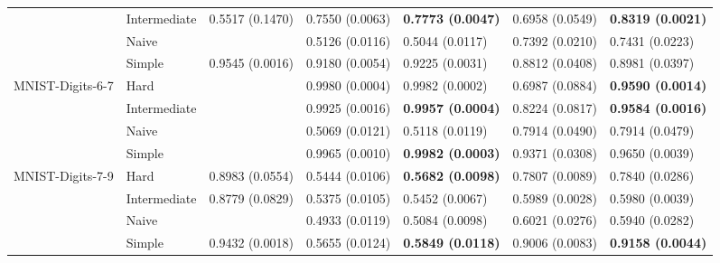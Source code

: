 \begin{tabular}{lllllll}
                 & Intermediate &  0.5517 (0.1470) &           0.7550 (0.0063) &  \textbf{0.7773 (0.0047)} &           0.6958 (0.0549) &  \textbf{0.8319 (0.0021)} \\
                 & Naive &                  &           0.5126 (0.0116) &           0.5044 (0.0117) &           0.7392 (0.0210) &           0.7431 (0.0223) \\
                 & Simple &  0.9545 (0.0016) &           0.9180 (0.0054) &           0.9225 (0.0031) &           0.8812 (0.0408) &           0.8981 (0.0397) \\
MNIST-Digits-6-7 & Hard &                  &           0.9980 (0.0004) &           0.9982 (0.0002) &           0.6987 (0.0884) &  \textbf{0.9590 (0.0014)} \\
                 & Intermediate &                  &           0.9925 (0.0016) &  \textbf{0.9957 (0.0004)} &           0.8224 (0.0817) &  \textbf{0.9584 (0.0016)} \\
                 & Naive &                  &           0.5069 (0.0121) &           0.5118 (0.0119) &           0.7914 (0.0490) &           0.7914 (0.0479) \\
                 & Simple &                  &           0.9965 (0.0010) &  \textbf{0.9982 (0.0003)} &           0.9371 (0.0308) &           0.9650 (0.0039) \\
MNIST-Digits-7-9 & Hard &  0.8983 (0.0554) &           0.5444 (0.0106) &  \textbf{0.5682 (0.0098)} &           0.7807 (0.0089) &           0.7840 (0.0286) \\
                 & Intermediate &  0.8779 (0.0829) &           0.5375 (0.0105) &           0.5452 (0.0067) &           0.5989 (0.0028) &           0.5980 (0.0039) \\
                 & Naive &                  &           0.4933 (0.0119) &           0.5084 (0.0098) &           0.6021 (0.0276) &           0.5940 (0.0282) \\
                 & Simple &  0.9432 (0.0018) &           0.5655 (0.0124) &  \textbf{0.5849 (0.0118)} &           0.9006 (0.0083) &  \textbf{0.9158 (0.0044)} \\
\bottomrule
\end{tabular}
